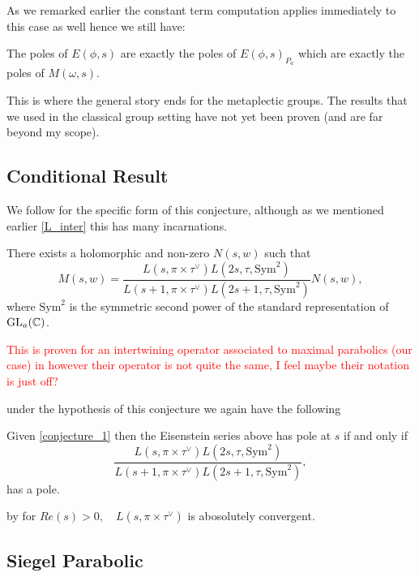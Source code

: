     As we remarked earlier the constant term computation applies immediately to this case as well hence we still have:
    \begin{Lemma}
            The poles of \(E(\phi, s)\) are exactly the poles of \(E(\phi,s)_{P_a}\) which are exactly the poles of \(M(\omega, s)\).
    \end{Lemma}
    This is where the general story ends for the metaplectic groups. The results that we used in the classical group setting have not yet been proven (and are far beyond my scope). 

    \subsection{Conditional Result}
     We follow \cite[Assumption 6.1]{wuThetaCorrespondenceSimple2024wuThetaCorrespondenceSimple2024} for the specific form of this conjecture, although as we mentioned earlier \ref{L_inter} this has many incarnations. 
     \begin{Conj}\label{conjecture_1}
        There exists a holomorphic and non-zero \(N(s,w)\) such that 
     \[M(s, w) = \frac{L(s, \pi\times \tau^{\vee}) L(2s, \tau, \mathrm{Sym}^2)}{L(s+1, \pi\times \tau^\vee)L(2s+1, \tau, \mathrm{Sym}^2)}N(s,w),\]
     where \(\mathrm{Sym}^2\) is the symmetric second power of the standard representation of \(\GL_a(\C)\).
     \end{Conj}
     \textcolor{red}{This is proven for an intertwining operator associated to maximal parabolics (our case) in \cite[Thm. 7.10]{gaoLanglandsShahidiFunctionsBrylinskiDeligne2018} however their operator is not quite the same, I feel maybe their notation is just off?}

     under the hypothesis of this conjecture we again have the following
     \begin{Lemma}
        Given \ref{conjecture_1} then the Eisenstein series above has pole at \(s\) if and only if 
        \[\frac{L(s, \pi\times \tau^{\vee}) L(2s, \tau, \mathrm{Sym}^2)}{L(s+1, \pi\times \tau^\vee)L(2s+1, \tau, \mathrm{Sym}^2)},\]
        has a pole.
     \end{Lemma}
     by \cite[Thm. 35]{kaplanDoublingConstructionsComplete2021a} for \(Re(s)>0, \quad L(s, \pi\times \tau^{\vee})\) is abosolutely convergent. 


    \subsection{Siegel Parabolic}


